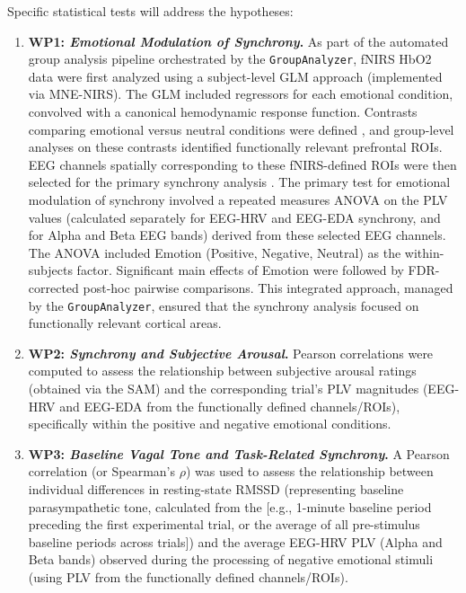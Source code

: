Specific statistical tests will address the hypotheses:
\begin{enumerate}[label=(\alph*)]
    \item \textbf{\gls{WP}1: \emph{Emotional Modulation of Synchrony}.} As part of the automated group analysis pipeline orchestrated by the \texttt{GroupAnalyzer}, \gls{fNIRS} \gls{HbO2} data were first analyzed using a subject-level \gls{GLM} approach (implemented via MNE-NIRS). The GLM included regressors for each emotional condition, convolved with a canonical hemodynamic response function. Contrasts comparing emotional versus neutral conditions were defined \parencite{yucelBestPracticesFNIRS2021}, and group-level analyses on these contrasts identified functionally relevant prefrontal \gls{ROI}s. \gls{EEG} channels spatially corresponding to these \gls{fNIRS}-defined \gls{ROI}s were then selected for the primary synchrony analysis \parencite{gramfortMEGEEGData2013}. The primary test for emotional modulation of synchrony involved a repeated measures \gls{ANOVA} on the \gls{PLV} values (calculated separately for \gls{EEG}-\gls{HRV} and \gls{EEG}-\gls{EDA} synchrony, and for Alpha and Beta \gls{EEG} bands) derived from these selected \gls{EEG} channels. The \gls{ANOVA} included Emotion (Positive, Negative, Neutral) as the within-subjects factor. Significant main effects of Emotion were followed by FDR-corrected post-hoc pairwise comparisons. This integrated approach, managed by the \texttt{GroupAnalyzer}, ensured that the synchrony analysis focused on functionally relevant cortical areas.
    \item \textbf{\gls{WP}2: \emph{Synchrony and Subjective Arousal}.} Pearson correlations were computed to assess the relationship between subjective arousal ratings (obtained via the \gls{SAM}) and the corresponding trial's \gls{PLV} magnitudes (\gls{EEG}-\gls{HRV} and \gls{EEG}-\gls{EDA} from the functionally defined channels/\gls{ROI}s), specifically within the positive and negative emotional conditions.
    \item \textbf{\gls{WP}3: \emph{Baseline Vagal Tone and Task-Related Synchrony}.} A Pearson correlation (or Spearman's $\rho$) was used to assess the relationship between individual differences in resting-state \gls{RMSSD} (representing baseline parasympathetic tone, calculated from the [e.g., 1-minute baseline period preceding the first experimental trial, or the average of all pre-stimulus baseline periods across trials]) and the average \gls{EEG}-\gls{HRV} \gls{PLV} (Alpha and Beta bands) observed during the processing of negative emotional stimuli (using \gls{PLV} from the functionally defined channels/\gls{ROI}s).

\end{enumerate}
